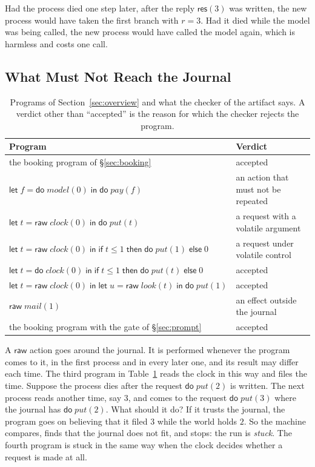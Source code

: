 \documentclass[acmsmall,nonacm,screen]{acmart}
\newcommand{\kw}[1]{\mathsf{#1}}
\newcommand{\nm}[1]{\mathit{#1}}
\newcommand{\letin}[3]{\kw{let}\;#1 = #2\;\kw{in}\;#3}
\newcommand{\ite}[3]{\kw{if}\;#1\;\kw{then}\;#2\;\kw{else}\;#3}
\newcommand{\doo}[2]{\kw{do}\;\nm{#1}(#2)}
\newcommand{\raw}[2]{\kw{raw}\;\nm{#1}(#2)}
\newcommand{\res}[1]{\kw{res}(#1)}
\begin{document}
Had the process died one step later, after the reply $\res{3}$ was written, the new process
would have taken the first branch with $r = 3$. Had it died while the model was being called,
the new process would have called the model again, which is harmless and costs one call.

\subsection{What Must Not Reach the Journal}
\label{sec:volatile}

\begin{table}[t]
\caption{Programs of Section~\ref{sec:overview} and what the checker of the artifact says. A
verdict other than ``accepted'' is the reason for which the checker rejects the program.}
\label{tab:verdicts}
\small
\begin{tabular}{@{}ll@{}}
\toprule
Program & Verdict \\
\midrule
the booking program of \S\ref{sec:booking} & accepted \\
$\letin{f}{\doo{model}{0}}{\doo{pay}{f}}$ & an action that must not be repeated \\
$\letin{t}{\raw{clock}{0}}{\doo{put}{t}}$ & a request with a volatile argument \\
$\letin{t}{\raw{clock}{0}}{\ite{t \le 1}{\doo{put}{1}}{0}}$ & a request under volatile control \\
$\letin{t}{\doo{clock}{0}}{\ite{t \le 1}{\doo{put}{t}}{0}}$ & accepted \\
$\letin{t}{\raw{clock}{0}}{\letin{u}{\raw{look}{t}}{\doo{put}{1}}}$ & accepted \\
$\raw{mail}{1}$ & an effect outside the journal \\
the booking program with the gate of \S\ref{sec:prompt} & accepted \\
\bottomrule
\end{tabular}
\end{table}

A $\kw{raw}$ action goes around the journal. It is performed whenever the program comes to
it, in the first process and in every later one, and its result may differ each time. The
third program in Table~\ref{tab:verdicts} reads the clock in this way and files the time.
Suppose the process dies after the request $\doo{put}{2}$ is written. The next process reads
another time, say $3$, and comes to the request $\doo{put}{3}$ where the journal has
$\doo{put}{2}$. What should it do? If it trusts the journal, the program goes on believing
that it filed $3$ while the world holds $2$. So the machine compares, finds that the journal
does not fit, and stops: the run is \emph{stuck}. The fourth program is stuck in the same way
when the clock decides whether a request is made at all.
\end{document}
